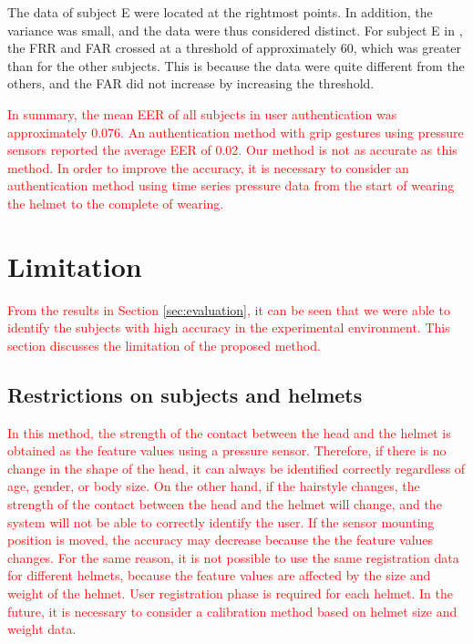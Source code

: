 \documentclass[english,preprint,JIP]{ipsj}
\begin{document}
The data of subject E were located at the rightmost points. In addition, the variance was small, and the data were thus considered distinct. For subject E in , the FRR and FAR crossed at a threshold of approximately 60, which was greater than for the other subjects. This is because the data were quite different from the others, and the FAR did not increase by increasing the threshold.\par

\textcolor{red}{In summary, the mean EER of all subjects in user authentication was approximately 0.076. An authentication method with grip gestures using pressure sensors\cite{murao_grip} reported the average EER of 0.02. Our method is not as accurate as this method. In order to improve the accuracy, it is necessary to consider an authentication method using time series pressure data from the start of wearing the helmet to the complete of wearing.}




\section{Limitation}
\label{sec:limitation}
\textcolor{red}{From the results in Section \ref{sec:evaluation}, it can be seen that we were able to identify the subjects with high accuracy in the experimental environment. This section discusses the limitation of the proposed method.}


\subsection{Restrictions on subjects and helmets}
\label{sec:subjects_and_helmets}

\textcolor{red}{In this method, the strength of the contact between the head and the helmet is obtained as the feature values using a pressure sensor. Therefore, if there is no change in the shape of the head, it can always be identified correctly regardless of age, gender, or body size. On the other hand, if the hairstyle changes, the strength of the contact between the head and the helmet will change, and the system will not be able to correctly identify the user. If the sensor mounting position is moved, the accuracy may decrease because the the feature values changes. For the same reason, it is not possible to use the same registration data for different helmets, because the feature values are affected by the size and weight of the helmet. User registration phase is required for each helmet. In the future, it is necessary to consider a calibration method based on helmet size and weight data.}
\end{document}
